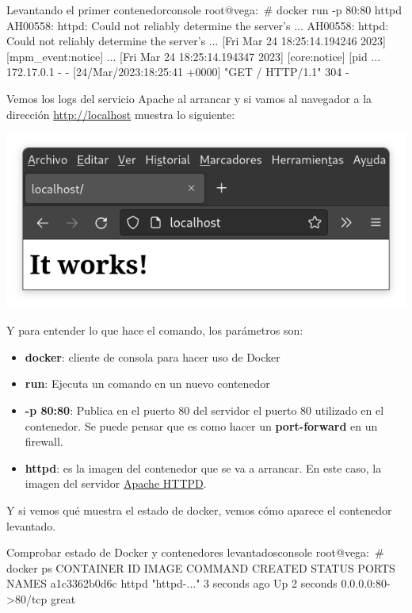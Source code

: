 \begin{mycode}{Levantando el primer contenedor}{console}{}
root@vega:~# docker run -p 80:80 httpd
AH00558: httpd: Could not reliably determine the server's ...
AH00558: httpd: Could not reliably determine the server's ...
[Fri Mar 24 18:25:14.194246 2023] [mpm_event:notice] ...
[Fri Mar 24 18:25:14.194347 2023] [core:notice] [pid  ...
172.17.0.1 - - [24/Mar/2023:18:25:41 +0000] "GET / HTTP/1.1" 304 -
\end{mycode}

Vemos los logs del servicio Apache al arrancar y si vamos al navegador a la dirección \href{http://localhost}{http://localhost} muestra lo siguiente:

\begin{center}
    \includegraphics[width=0.6\linewidth]{img/docker/apache.png}
\end{center}

Y para entender lo que hace el comando, los parámetros son:
\begin{itemize}
    \item \textbf{docker}: cliente de consola para hacer uso de Docker
    \item \textbf{run}: Ejecuta un comando en un nuevo contenedor
    \item \textbf{-p 80:80}: Publica en el puerto 80 del servidor el puerto 80 utilizado en el contenedor. Se puede pensar que es como hacer un \textbf{port-forward} en un firewall.
    \item \textbf{httpd}: es la imagen del contenedor que se va a arrancar. En este caso, la imagen del servidor \href{https://hub.docker.com/_/httpd}{Apache HTTPD}.
\end{itemize}

Y si vemos qué muestra el estado de docker, vemos cómo aparece el contenedor levantado.

\begin{mycode}{Comprobar estado de Docker y contenedores levantados}{console}{{\scriptsize }}
root@vega:~# docker ps
CONTAINER ID   IMAGE     COMMAND       CREATED         STATUS         PORTS               NAMES
a1c3362b0d6c   httpd     "httpd-..."   3 seconds ago   Up 2 seconds   0.0.0.0:80->80/tcp  great
\end{mycode}

